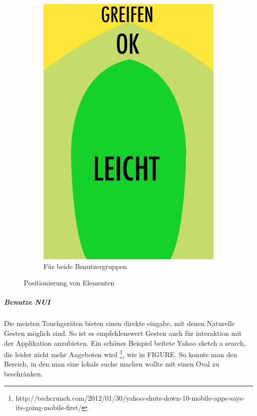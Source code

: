 \begin{figure}
\begin{subfigure}[b]{0.3\textwidth}
	\end{subfigure}
	\begin{subfigure}[b]{0.3\textwidth}
		\centering
			\includegraphics[width=1\textwidth]{img/anordungDerElementeForAll.png}
			\caption{Für beide Benutzergruppen}\label{fig:forallPositioning}
			
	\end{subfigure}
	\caption{Positionierung von Elementen}\label{fig:elementPos}
\end{figure}


\subparagraph{Benutze NUI} 
\label{subp:benutze_nui}

Die meisten Touchgeräten bieten einen direkte eingabe, mit denen Naturelle Gesten möglich sind. So ist es empfehlenswert Gesten auch für interaktion mit der Applikation anzubieten. Ein schönes Beispiel beitete Yahoo sketch a search, die leider nicht mehr Angeboten wird \footnote{http://techcrunch.com/2012/01/30/yahoo-shuts-down-10-mobile-apps-says-its-going-mobile-first/ }, wie in FIGURE. So konnte man den Bereich, in den man eine lokale suche machen wollte mit einen Oval zu beschränken.

